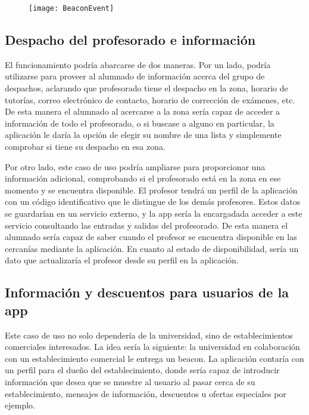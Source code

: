 \begin{figure}[H]
	\centering
	\texttt{[image: BeaconEvent]}
	\label{fig:eventBeacon}
\end{figure}

\subsection{Despacho del profesorado e información}

El funcionamiento podría abarcarse de dos maneras. Por un lado, podría utilizarse para proveer al alumnado de información acerca del grupo de despachos, aclarando que profesorado tiene el despacho en la zona, horario de tutorías, correo electrónico de contacto, horario de corrección de exámenes, etc. De esta manera el alumnado al acercarse a la zona sería capaz de acceder a información de todo el profesorado, o si buscase a alguno en particular, la aplicación le daría la opción de elegir su nombre de una lista y simplemente comprobar si tiene su despacho en esa zona. 

Por otro lado, este caso de uso podría ampliarse para proporcionar una información adicional, comprobando si el profesorado está en la zona en ese momento y se encuentra disponible. El profesor tendrá un perfil de la aplicación con un código identificativo que le distingue de los demás profesores. Estos datos se guardarían en un servicio externo, y la app sería la encargadada acceder a este servicio consultando las entradas y salidas del profesorado. De esta manera el alumnado sería capaz de saber cuando el profesor se encuentra disponible en las cercanías mediante la aplicación. En cuanto al estado de disponibilidad, sería un dato que actualizaría el profesor desde su perfil en la aplicación. 

\subsection{Información y descuentos para usuarios de la app}

Este caso de uso no solo dependería de la universidad, sino de establecimientos comerciales interesados. La idea sería la siguiente: la universidad en colaboración con un establecimiento comercial le entrega un beacon. La aplicación contaría con un perfil para el dueño del establecimiento, donde sería capaz de introducir información que desea que se muestre al usuario al pasar cerca de su establecimiento, mensajes de información, descuentos u ofertas especiales por ejemplo. 

